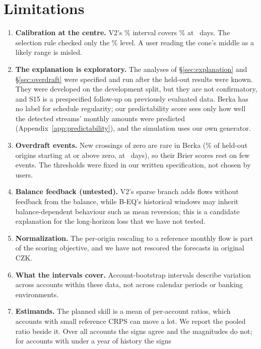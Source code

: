 \section{Limitations}
\label{sec:limitations}

\begin{enumerate}[label=\arabic*.]
\item \textbf{Calibration at the centre.} V2's \lA\% interval covers
  \% at \hB\ days. The selection rule checked only the
  \lC\% level. A user reading the cone's middle as a likely range is
  misled.
\item \textbf{The explanation is exploratory.} The analyses of
  \S\ref{sec:explanation} and \S\ref{sec:overdraft} were specified and run
  after the held-out results were known. They were developed on the
  development split, but they are not confirmatory, and S15 is a
  prespecified follow-up on previously evaluated data. Berka has no label
  for schedule regularity; our predictability score sees only how well
  the detected streams' monthly amounts were predicted
  (Appendix~\ref{app:predictability}), and the simulation uses our own
  generator.
\item \textbf{Overdraft events.} New crossings of zero are rare in Berka
  (\% of held-out origins
  starting at or above zero, at \hB\ days), so their Brier scores rest on
  few events. The thresholds were fixed in our written
  specification, not chosen by users.
\item \textbf{Balance feedback (untested).} V2's sparse branch adds flows
  without feedback from the balance, while B-EQ's historical windows may
  inherit balance-dependent behaviour such as mean reversion; this is a
  candidate explanation for the long-horizon loss that we have not tested.
\item \textbf{Normalization.} The per-origin rescaling to a reference
  monthly flow is part of the scoring objective, and we have not rescored
  the forecasts in original CZK.
\item \textbf{What the intervals cover.} Account-bootstrap intervals
  describe variation across accounts within these data, not across
  calendar periods or banking environments.
\item \textbf{Estimands.} The planned skill is a mean of per-account ratios,
  which accounts with small reference CRPS can move a lot. We report the
  pooled ratio beside it. Over all accounts the signs agree and the
  magnitudes do not; for accounts with under a year of history the signs

\end{enumerate}
